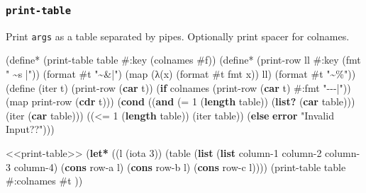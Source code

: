 \documentclass[
]{article}
\newenvironment{Shaded}{}{}
\newcommand{\DecValTok}[1]{\textcolor[rgb]{0.25,0.63,0.44}{#1}}
\newcommand{\ExtensionTok}[1]{#1}
\newcommand{\FunctionTok}[1]{\textcolor[rgb]{0.02,0.16,0.49}{#1}}
\newcommand{\KeywordTok}[1]{\textcolor[rgb]{0.00,0.44,0.13}{\textbf{#1}}}
\newcommand{\NormalTok}[1]{#1}
\newcommand{\OperatorTok}[1]{\textcolor[rgb]{0.40,0.40,0.40}{#1}}
\newcommand{\StringTok}[1]{\textcolor[rgb]{0.25,0.44,0.63}{#1}}
\begin{document}
\hypertarget{print-table}{%
\subsubsection{\texorpdfstring{\texttt{print-table}}{print-table}}\label{print-table}}

Print \texttt{args} as a table separated by pipes. Optionally print
spacer for colnames.

\hypertarget{print-table}{%
\label{print-table}}%
\begin{Shaded}
\begin{Highlighting}[numbers=left,,]
\NormalTok{(}\ExtensionTok{define*}\FunctionTok{ }\NormalTok{(print{-}table table \#:key (colnames }\DecValTok{\#f}\NormalTok{))}
\NormalTok{  (}\ExtensionTok{define*}\FunctionTok{ }\NormalTok{(print{-}row ll \#:key (fmt }\StringTok{" \textasciitilde{}s |"}\NormalTok{))}
\NormalTok{    (format }\DecValTok{\#t} \StringTok{"\textasciitilde{}\&|"}\NormalTok{)}
\NormalTok{    (map (λ(x) (format }\DecValTok{\#t}\NormalTok{ fmt x)) ll)}
\NormalTok{    (format }\DecValTok{\#t} \StringTok{"\textasciitilde{}\%"}\NormalTok{))}
\NormalTok{  (}\ExtensionTok{define}\FunctionTok{ }\NormalTok{(iter t)}
\NormalTok{    (print{-}row (}\KeywordTok{car}\NormalTok{ t))}
\NormalTok{    (}\KeywordTok{if}\NormalTok{ colnames}
\NormalTok{        (print{-}row (}\KeywordTok{car}\NormalTok{ t) \#:fmt }\StringTok{"{-}{-}{-}|"}\NormalTok{))}
\NormalTok{    (map print{-}row (}\KeywordTok{cdr}\NormalTok{ t)))}
\NormalTok{  (}\KeywordTok{cond}\NormalTok{ ((}\KeywordTok{and}\NormalTok{ (}\OperatorTok{=} \DecValTok{1}\NormalTok{ (}\KeywordTok{length}\NormalTok{ table))}
\NormalTok{              (}\KeywordTok{list?}\NormalTok{ (}\KeywordTok{car}\NormalTok{ table))) (iter (}\KeywordTok{car}\NormalTok{ table)))}
\NormalTok{        ((}\OperatorTok{\textless{}=} \DecValTok{1}\NormalTok{ (}\KeywordTok{length}\NormalTok{ table)) (iter table))}
\NormalTok{        (}\KeywordTok{else} \KeywordTok{error} \StringTok{"Invalid Input??"}\NormalTok{)))}
\end{Highlighting}
\end{Shaded}

\hypertarget{print-table-test}{%
\label{print-table-test}}%
\begin{Shaded}
\begin{Highlighting}[numbers=left,,]
\NormalTok{\textless{}\textless{}print{-}table\textgreater{}\textgreater{}}
\NormalTok{(}\KeywordTok{let*}\NormalTok{ ((l (iota }\DecValTok{3}\NormalTok{))}
\NormalTok{      (table (}\KeywordTok{list}
\NormalTok{              (}\KeywordTok{list}\NormalTok{ \textquotesingle{}column{-}1 \textquotesingle{}column{-}2 \textquotesingle{}column{-}3 \textquotesingle{}column{-}4)}
\NormalTok{              (}\KeywordTok{cons}\NormalTok{ \textquotesingle{}row{-}a l)}
\NormalTok{              (}\KeywordTok{cons}\NormalTok{ \textquotesingle{}row{-}b l)}
\NormalTok{              (}\KeywordTok{cons}\NormalTok{ \textquotesingle{}row{-}c l))))}
\NormalTok{  (print{-}table table \#:colnames }\DecValTok{\#t}\NormalTok{ ))}
\end{Highlighting}
\end{Shaded}
\end{document}
